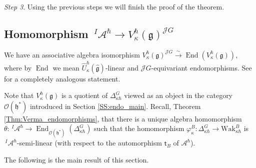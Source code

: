 \documentclass{amsart}
\theoremstyle{definition}
\newcommand{\on}{\mathrm}
\newcommand{\g}{\mathfrak{g}}
\newcommand{\hg}{\hat{\mathfrak{g}}}
\newcommand{\h}{\mathfrak{h}}
\newcommand{\Wak}{\on{Wak}}
\newcommand{\A}{\mathscr{A}}
\newcommand{\Jet}{\mathscr{J}}
\newcommand{\sO}{\mathscr{O}}
\numberwithin{equation}{section}
\begin{document}
{\it Step 3}. Using the previous steps we will finish the proof of the theorem.



\subsection{Homomorphism $\,^I\!\A^\hbar\rightarrow V^\hbar_\kappa(\g)^{\Jet G}$}
We have an associative algebra isomorphism 
$V^\hbar_\kappa(\g)^{\Jet G}\xrightarrow{\sim} \operatorname{End}(V^\hbar_\kappa(\g))$, where by $\operatorname{End}$ we mean $\widehat{U}^\hbar_\kappa(\hg)$-linear and $\Jet G$-equivariant endomorphisms. See \cite[(3.3-3)]{Frenkel_loop} for a completely analogous statement.

Note that $V^\hbar_\kappa(\g)$ is a quotient of  $\Delta^G_{\kappa\hbar}$ viewed as an object in the category $\sO(\h^*)$ introduced in Section \ref{SS:endo_main}. Recall, Theorem \ref{Thm:Verma_endomorphisms}, that there is a unique algebra homomorphism $\theta:\,^I\!\A^\hbar\rightarrow \operatorname{End}_{\sO(\h^*)}(\Delta^G_{\kappa\hbar})$ such that the homomorphism $\varphi^B_\kappa: \Delta^G_{\kappa\hbar}\rightarrow \Wak^B_{\kappa\hbar}$ is $\,^I\!\A^\hbar$-semi-linear
(with respect to the automorphism $\mathsf{t}_B$ of $\A^\hbar$). 

The following is the main result of this section. 
\end{document}
